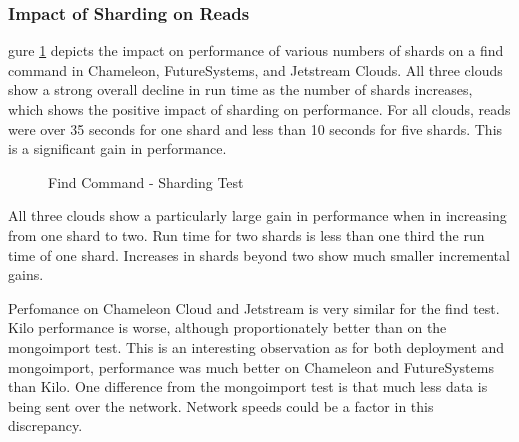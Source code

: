 \documentclass[9pt,twocolumn,twoside]{../../styles/osajnl}
\begin{document}
\subsubsection{Impact of Sharding on Reads}


gure \ref{fig:shard-find} depicts the impact on performance of various
numbers of shards on a find command in Chameleon, FutureSystems, and
Jetstream Clouds. All three clouds show a strong overall decline in
run time as the number of shards increases, which shows the positive
impact of sharding on performance. For all clouds, reads were over 35
seconds for one shard and less than 10 seconds for five shards. This
is a significant gain in performance.

\begin{figure}[htbp]
\centering
{}
\caption{Find Command - Sharding Test}
\label{fig:shard-find}
\end{figure}


All three clouds show a particularly large gain in performance when in
increasing from one shard to two. Run time for two shards is less than
one third the run time of one shard. Increases in shards beyond two
show much smaller incremental gains.

Perfomance on Chameleon Cloud and Jetstream is very similar for the
find test. Kilo performance is worse, although proportionately better
than on the mongoimport test. This is an interesting observation as
for both deployment and mongoimport, performance was much better on
Chameleon and FutureSystems than Kilo. One difference from the
mongoimport test is that much less data is being sent over the
network. Network speeds could be a factor in this discrepancy.
\end{document}
